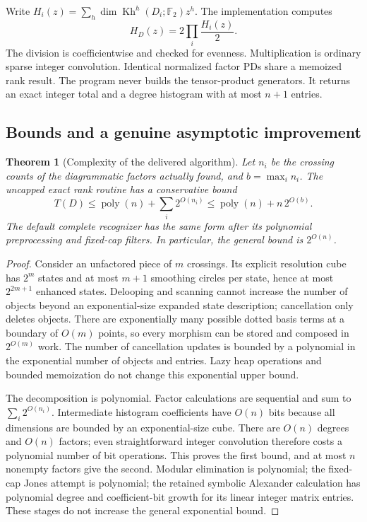 \documentclass[11pt,letterpaper]{article}
\newtheorem{theorem}{Theorem}[section]
\theoremstyle{definition}\newtheorem{definition}[theorem]{Definition}
\theoremstyle{remark}\newtheorem{remark}[theorem]{Remark}
\newcommand{\F}{\mathbb F}
\newcommand{\Kh}{\operatorname{Kh}}
\newcommand{\poly}{\operatorname{poly}}
\begin{document}
Write $H_i(z)=\sum_h\dim\Kh^h(D_i;\F_2)z^h$. The implementation computes
\begin{equation}\label{eq:convolution}
 H_D(z)=2\prod_i \frac{H_i(z)}{2}.
\end{equation}
The division is coefficientwise and checked for evenness. Multiplication is
ordinary sparse integer convolution. Identical normalized factor PDs share a
memoized rank result. The program never builds the tensor-product generators.
It returns an exact integer total and a degree histogram with at most $n+1$
entries.

\subsection{Bounds and a genuine asymptotic improvement}
\label{sec:bounds}

\begin{theorem}[Complexity of the delivered algorithm]
Let $n_i$ be the crossing counts of the diagrammatic factors actually found, and
$b=\max_i n_i$. The uncapped exact rank routine has a conservative bound
\[
 T(D)\le\poly(n)+\sum_i 2^{O(n_i)}
        \le\poly(n)+n\,2^{O(b)}.
\]
The default complete recognizer has the same form after its polynomial
preprocessing and fixed-cap filters. In particular, the general bound is
$2^{O(n)}$.
\end{theorem}
\begin{proof}
Consider an unfactored piece of $m$ crossings. Its explicit resolution cube has
$2^m$ states and at most $m+1$ smoothing circles per state, hence at most
$2^{2m+1}$ enhanced states. Delooping and scanning cannot increase the number of
objects beyond an exponential-size expanded state description; cancellation
only deletes objects. There are exponentially many possible dotted basis terms
at a boundary of $O(m)$ points, so every morphism can be stored and composed in
$2^{O(m)}$ work. The number of cancellation updates is bounded by a polynomial
in the exponential number of objects and entries. Lazy heap operations and
bounded memoization do not change this exponential upper bound.

The decomposition is polynomial. Factor calculations are sequential and sum to
$\sum_i2^{O(n_i)}$. Intermediate histogram coefficients have $O(n)$ bits because
all dimensions are bounded by an exponential-size cube. There are $O(n)$ degrees
and $O(n)$ factors; even straightforward integer convolution therefore costs a
polynomial number of bit operations. This proves the first bound, and at most
$n$ nonempty factors give the second. Modular elimination is polynomial; the
fixed-cap Jones attempt is polynomial; the retained symbolic Alexander
calculation has polynomial degree and coefficient-bit growth for its linear
integer matrix entries. These stages do not increase the general exponential
bound.
\end{proof}
\end{document}
